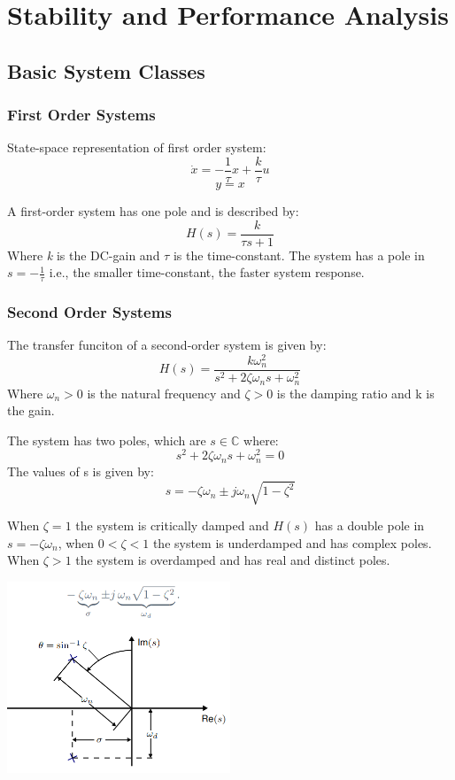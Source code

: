 \section{Stability and Performance Analysis}

\subsection{Basic System Classes}

\subsubsection{First Order Systems}
State-space representation of first order system:
$$\dot{x} = -\frac{1}{\tau}x+\frac{k}{\tau}u$$
$$y=x$$

A first-order system has one  pole and is described by:
$$H(s)=\frac{k}{\tau s+1}$$
Where \emph{k} is the DC-gain and $\tau$ is the time-constant. The system has a pole
in $s=-\frac{1}{\tau}$ i.e., the smaller time-constant, the faster system response.


\subsubsection{Second Order Systems}
The transfer funciton of a second-order system is given by:
$$H(s) = \frac{k \omega_n^2}{s^2+2\zeta\omega_n s+\omega_n^2}$$
Where $\omega_n>0$ is the natural frequency and $\zeta>0$ is the damping ratio and k is the gain.

The system has two poles, which are $s\in \mathbb{C}$ where:
$$s^2+2\zeta\omega_n s+\omega_n^2=0$$
The values of s is given by:
$$s = -\zeta\omega_n \pm j\omega_n\sqrt{1-\zeta^2}$$

When $\zeta=1$ the system is critically damped and $H(s)$ has a double pole in $s=-\zeta \omega_n$,
when $0<\zeta<1$ the system is underdamped and has complex poles.
When $\zeta>1$ the system is overdamped and has real and distinct poles.

\begin{center}
	\includegraphics[width=0.5\textwidth]{Images/secondOrderSystem.png}
\end{center}

